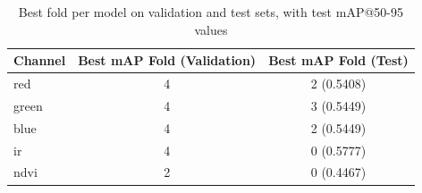 \begin{table}[h]
\centering
\begin{tabular}{l c c}
\hline
\textbf{Channel} & \textbf{Best mAP Fold (Validation)} & \textbf{Best mAP Fold (Test)} \\ 
\hline
red   & 4 & 2 (0.5408) \\
green & 4 & 3 (0.5449) \\
blue  & 4 & 2 (0.5449) \\
ir    & 4 & 0 (0.5777) \\
ndvi  & 2 & 0 (0.4467) \\
\hline
\end{tabular}
\caption{Best fold per model on validation and test sets, with test mAP@50-95 values}
\label{tab:ablation_best_folds_test}
\end{table}

